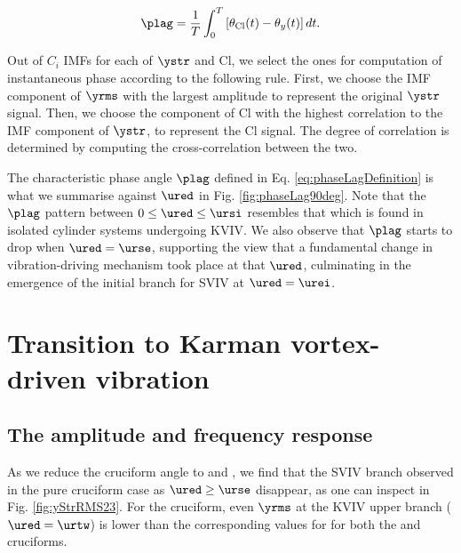 \documentclass[a4paper,fleqn]{cas-sc}
\begin{document}
\begin{equation}
  \plag = \frac{1}{T} \int_{0}^{T} \left[ \theta_{\text{Cl}}(t) - \theta_{y}(t) \right] dt.
  \label{eq:phaseLagDefinition}
\end{equation}

Out of $C_{i}$ IMFs for each of $\ystr$ and Cl, we select the ones for computation of instantaneous phase according to the following rule. First, we choose the IMF component of $\yrms$ with the largest \rms{} amplitude to represent the original $\ystr$ signal. Then, we choose the component of Cl with the highest correlation to the IMF component of $\ystr$, to represent the Cl signal. The degree of correlation is determined by computing the cross-correlation between the two.

The characteristic phase angle $\plag$ defined in Eq. \ref{eq:phaseLagDefinition} is what we summarise against $\ured$ in Fig. \ref{fig:phaseLag90deg}. Note that the $\plag$ pattern between $0 \leq \ured \leq \ursi$ resembles that which is found in isolated cylinder systems undergoing KVIV. We also observe that $\plag$ starts to drop when $\ured = \urse$, supporting the view that a fundamental change in vibration-driving mechanism took place at that $\ured$, culminating in the emergence of the initial branch for SVIV at $\ured = \urei$.

\section{Transition to Karman vortex-driven vibration}\label{sec:transitionToKarman}
\subsection{The amplitude and frequency response}\label{ssec:transRegimeAmpFreqResp}

As we reduce the cruciform angle to \angfo{} and \angth{}, we find that the SVIV branch observed in the pure cruciform case as $\ured \geq \urse$ disappear, as one can inspect in Fig. \ref{fig:yStrRMS23}. For the \angth{} cruciform, even $\yrms$ at the KVIV upper branch ($\ured = \urtw$) is lower than the corresponding values for for both the \angfi{} and \angfo{} cruciforms.
\end{document}
